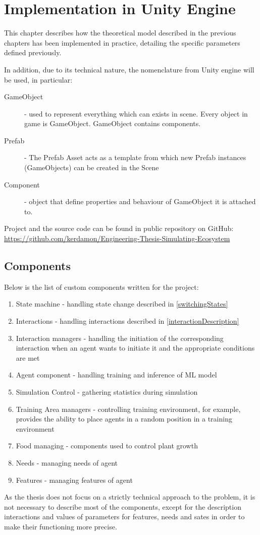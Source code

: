 \chapter{Implementation in Unity Engine}
This chapter describes how the theoretical model described in the previous chapters has been implemented in practice, detailing the specific parameters defined previously.

In addition, due to its technical nature, the nomenclature from Unity engine \cite{UnityGlossary} will be used, in particular:

\begin{description}
    \item[GameObject] - used to represent everything which can exists in scene. Every object in game is GameObject. GameObject contains components.
    \item[Prefab] - The Prefab Asset acts as a template from which new Prefab instances (GameObjects) can be created in the Scene
    \item[Component] - object that define properties and behaviour of GameObject it is attached to.
\end{description}
Project and the source code can be found in public repository on GitHub:
\url{https://github.com/kerdamon/Engineering-Thesis-Simulating-Ecosystem}

\section{Components}
Below is the list of custom components written for the project:

\begin{enumerate}
    \item State machine - handling state change described in \autoref{switchingStates}
    \item Interactions - handling interactions described in \autoref{interactionDescription}
    \item Interaction managers - handling the initiation of the corresponding interaction when an agent wants to initiate it and the appropriate conditions are met
    \item Agent component - handling training and inference of ML model
    \item Simulation Control - gathering statistics during simulation
    \item Training Area managers - controlling training environment, for example, provides the ability to place agents in a random position in a training environment
    \item Food managing - components used to control plant growth
    \item Needs - managing needs of agent
    \item Features - managing features of agent
\end{enumerate}
As the thesis does not focus on a strictly technical approach to the problem, it is not necessary to describe most of the components, except for the description interactions and values of parameters for features, needs and sates in order to make their functioning more precise.

